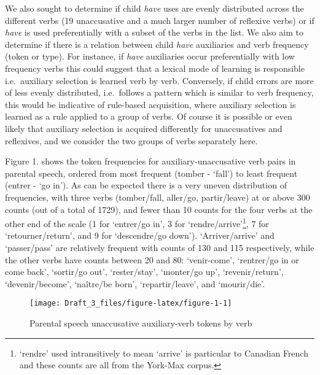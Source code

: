 \documentclass[
  12pt,
]{article}
\begin{document}
\begin{enumerate}[resume*]
\begin{enumerate}[resume*]
\begin{enumerate}[resume*]
\begin{enumerate}[resume*]
\begin{enumerate}[resume*]
We also sought to determine if child \emph{have} uses are evenly distributed across the different verbs (19 unaccusative and a much larger number of reflexive verbs) or if \emph{have} is used preferentially with a subset of the verbs in the list. We also aim to determine if there is a relation between child \emph{have} auxiliaries and verb frequency (token or type). For instance, if \emph{have} auxiliaries occur preferentially with low frequency verbs this could suggest that a lexical mode of learning is responsible i.e.~auxiliary selection is learned verb by verb. Conversely, if child errors are more of less evenly distributed, i.e.~follows a pattern which is similar to verb frequency, this would be indicative of rule-based acquisition, where auxiliary selection is learned as a rule applied to a group of verbs. Of course it is possible or even likely that auxiliary selection is acquired differently for unaccusatives and reflexives, and we consider the two groups of verbs separately here.

Figure 1. shows the token frequencies for auxiliary-unaccusative verb pairs in parental speech, ordered from most frequent (tomber - `fall') to least frequent (entrer - `go in'). As can be expected there is a very uneven distribution of frequencies, with three verbs (tomber/fall, aller/go, partir/leave) at or above 300 counts (out of a total of 1729), and fewer than 10 counts for the four verbs at the other end of the scale (1 for `entrer/go in', 3 for `rendre/arrive'\footnote{`rendre' used intransitively to mean `arrive' is particular to Canadian French and these counts are all from the York-Max corpus.}, 7 for `retourner/return', and 9 for `descendre/go down'). `Arriver/arrive' and `passer/pass' are relatively frequent with counts of 130 and 115 respectively, while the other verbs have counts between 20 and 80: `venir-come', `rentrer/go in or come back', `sortir/go out', `rester/stay', `monter/go up', `revenir/return', `devenir/become', `naître/be born', `repartir/leave', and `mourir/die'.

\begin{figure}

{\centering \texttt{[image: Draft\_3\_files/figure-latex/figure-1-1]} 

}

\caption{Parental speech unaccusative auxiliary-verb tokens by verb}\label{fig:figure-1}
\end{figure}


\end{enumerate}
\end{enumerate}
\end{enumerate}
\end{enumerate}
\end{enumerate}
\end{document}
